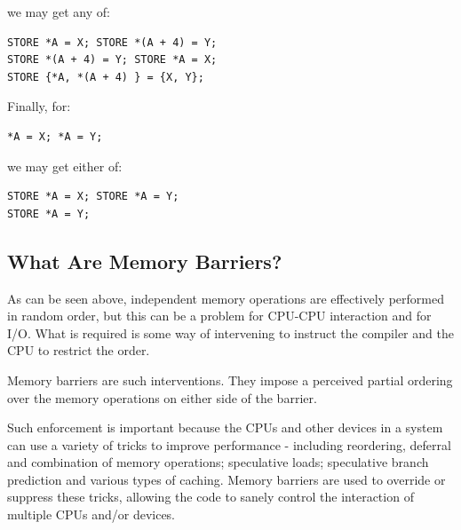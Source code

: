 \begin{enumerate}
	we may get any of:

\begin{minipage}[t]{\columnwidth}
\scriptsize
\begin{verbatim}
STORE *A = X; STORE *(A + 4) = Y;
STORE *(A + 4) = Y; STORE *A = X;
STORE {*A, *(A + 4) } = {X, Y};
\end{verbatim}
\vspace{1pt}
\end{minipage}

	Finally, for:

\begin{minipage}[t]{\columnwidth}
\scriptsize
\begin{verbatim}
*A = X; *A = Y;
\end{verbatim}
\end{minipage}

	we may get either of:

\begin{minipage}[t]{\columnwidth}
\scriptsize
\begin{verbatim}
STORE *A = X; STORE *A = Y;
STORE *A = Y;
\end{verbatim}
\end{minipage}

\end{enumerate}

\subsection{What Are Memory Barriers?}
\label{sec:advsync:What Are Memory Barriers?}

As can be seen above, independent memory operations are effectively performed
in random order, but this can be a problem for CPU-CPU interaction and for I/O.
What is required is some way of intervening to instruct the compiler and the
CPU to restrict the order.

Memory barriers are such interventions.  They impose a perceived partial
ordering over the memory operations on either side of the barrier.

Such enforcement is important because the CPUs and other devices in a system
can use a variety of tricks to improve performance - including reordering,
deferral and combination of memory operations; speculative loads; speculative
branch prediction and various types of caching.  Memory barriers are used to
override or suppress these tricks, allowing the code to sanely control the
interaction of multiple CPUs and/or devices.

